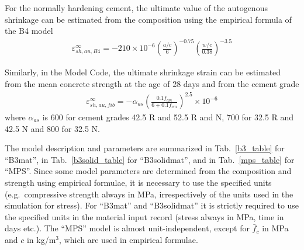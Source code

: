 \documentclass[a4paper]{article}
\begin{document}
For the normally hardening cement, the ultimate value of the autogenous shrinkage can be estimated from the composition using the empirical formula of the B4 model
%
\begin{eqnarray}
\varepsilon_{sh,au,B4}^\infty = -210 \times 10^{-6}  \left ( \frac{a/c}{6} \right ) ^{-0.75} \left ( \frac{w/c}{0.38} \right ) ^ {-3.5}\label{eq:auto_ultimate_B4}
\end{eqnarray}
%

Similarly, in the Model Code, the ultimate shrinkage strain can be estimated from the mean concrete strength at the age of 28 days and from the cement grade 
%
\begin{eqnarray}
\varepsilon_{sh,au,fib}^\infty = -\alpha_{as} \left( \frac{ 0.1 f_{cm} } { 6 + 0.1 f_{cm} }\right) ^{2.5} \times 10^{-6}
\label{eq:auto_ultimate_fib}
\end{eqnarray}
%
where $\alpha_{as}$ is 600 for cement grades 42.5 R and 52.5 R and N, 700 for 32.5 R and 42.5 N and 800 for 32.5 N.


The model description and parameters are summarized
in Tab.~\ref{b3_table} for ``B3mat'', in Tab.~\ref{b3solid_table} for ``B3solidmat'', and in Tab.~\ref{mps_table} for ``MPS''. 
Since some model parameters are determined from the composition
and strength using empirical formulae, it is necessary to use the
specified units (e.g.\ compressive strength always in MPa, irrespectively
of the units used in the simulation for stress). 
For ``B3mat'' and ``B3solidmat'' it is strictly 
required to use the specified units in the material input record (stress always in MPa, time in days etc.). 
The ``MPS'' model is almost unit-independent, except for 
$\bar{f}_c$ in MPa and $c$ in kg/m$^3$, which are used in empirical formulae.

\end{document}

